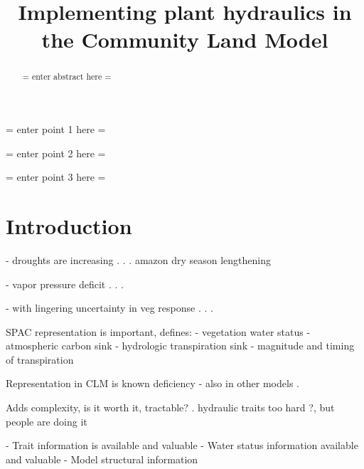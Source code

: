 \documentclass[draft,linenumbers]{agujournal}
\begin{document}
\title{Implementing plant hydraulics in the Community Land Model}



\begin{keypoints}
\item = enter point 1 here = 
\item = enter point 2 here = 
\item = enter point 3 here = 
\end{keypoints}


\begin{abstract}
= enter abstract here =
\end{abstract}


\section{Introduction}

 - droughts are increasing 
      . \citep{cook2015}
      . \citep{dai2013}
      . amazon dry season lengthening \citep{fu2013}

 - vapor pressure deficit 
      . \citep{mcdowell2015}
      . \citep{novick2016b}
      . \citep{williams2013}

 - with lingering uncertainty in veg response
      . \citep{dekauwe2017}
      . \citep{friedlingstein2014}
      . \citep{anderegg2015b}


SPAC representation is important, defines:
  - vegetation water status
  - atmospheric carbon sink
  - hydrologic transpiration sink
  - magnitude and timing of transpiration

Representation in CLM is known deficiency
  - also in other models
      . \citep{powell2013,ukkola2016}


Adds complexity, is it worth it, tractable?
       . hydraulic traits too hard \citep{drake2017}?, but people are doing it \citep{xu2016,christoffersen2016}

  - Trait information is available \citep{kattge2011,anderegg2015a} and valuable \citep{choat2012}
  - Water status information available \citep{konings2016,grant2016} and valuable \citep{momen2017,konings2017b}
  - Model structural information
  
\end{document}
